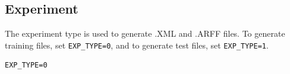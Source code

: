 \documentclass[11pt]{article}
\begin{document}
\subsection{Experiment}
The experiment type is used to generate .XML and .ARFF files. 
To generate training files, set \texttt{EXP\_TYPE=0}, and to generate test files, set \texttt{EXP\_TYPE=1}.
\begin{lstlisting}
EXP_TYPE=0
\end{lstlisting}

% 
% 
% 
% 
\end{document}
